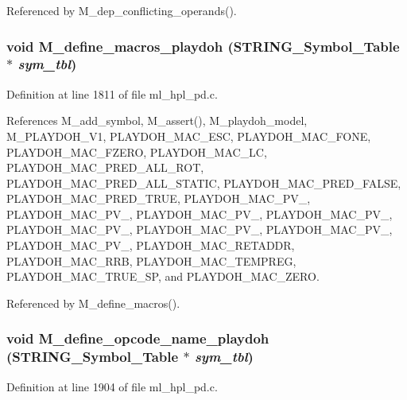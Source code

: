 Referenced by M\_\-dep\_\-conflicting\_\-operands().
\subsubsection{\setlength{\rightskip}{0pt plus 5cm}void M\_\-define\_\-macros\_\-playdoh (\bf{STRING\_\-Symbol\_\-Table} $\ast$ {\em sym\_\-tbl})}\label{ml__hpl__pd_8c_2ffe4fc6b506961a1c795626147d70a7}




Definition at line 1811 of file ml\_\-hpl\_\-pd.c.

References M\_\-add\_\-symbol, M\_\-assert(), M\_\-playdoh\_\-model, M\_\-PLAYDOH\_\-V1, PLAYDOH\_\-MAC\_\-ESC, PLAYDOH\_\-MAC\_\-FONE, PLAYDOH\_\-MAC\_\-FZERO, PLAYDOH\_\-MAC\_\-LC, PLAYDOH\_\-MAC\_\-PRED\_\-ALL\_\-ROT, PLAYDOH\_\-MAC\_\-PRED\_\-ALL\_\-STATIC, PLAYDOH\_\-MAC\_\-PRED\_\-FALSE, PLAYDOH\_\-MAC\_\-PRED\_\-TRUE, PLAYDOH\_\-MAC\_\-PV\_, PLAYDOH\_\-MAC\_\-PV\_, PLAYDOH\_\-MAC\_\-PV\_, PLAYDOH\_\-MAC\_\-PV\_, PLAYDOH\_\-MAC\_\-PV\_, PLAYDOH\_\-MAC\_\-PV\_, PLAYDOH\_\-MAC\_\-PV\_, PLAYDOH\_\-MAC\_\-PV\_, PLAYDOH\_\-MAC\_\-RETADDR, PLAYDOH\_\-MAC\_\-RRB, PLAYDOH\_\-MAC\_\-TEMPREG, PLAYDOH\_\-MAC\_\-TRUE\_\-SP, and PLAYDOH\_\-MAC\_\-ZERO.

Referenced by M\_\-define\_\-macros().
\subsubsection{\setlength{\rightskip}{0pt plus 5cm}void M\_\-define\_\-opcode\_\-name\_\-playdoh (\bf{STRING\_\-Symbol\_\-Table} $\ast$ {\em sym\_\-tbl})}\label{ml__hpl__pd_8c_07973b7581803a3453297a052f5cdced}




Definition at line 1904 of file ml\_\-hpl\_\-pd.c.

